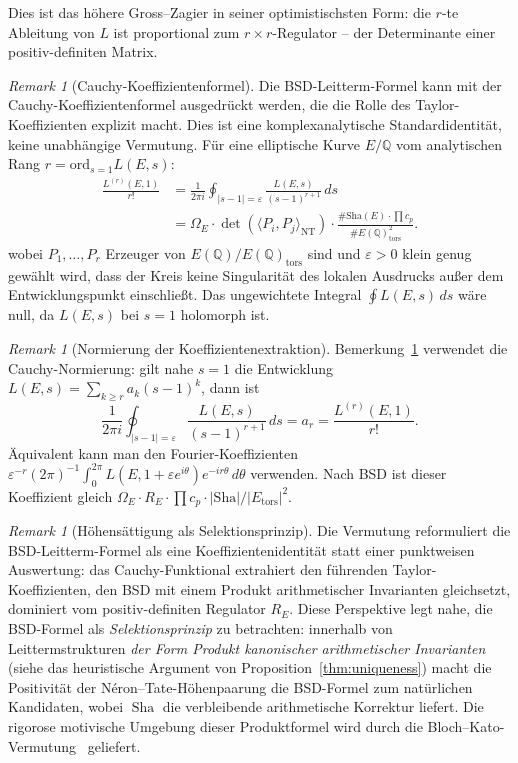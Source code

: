 \documentclass[aps,prd,twocolumn,superscriptaddress,nofootinbib,floatfix]{revtex4-2}
\theoremstyle{definition}
\theoremstyle{remark}
\newtheorem{remark}[theorem]{Remark}
\DeclareMathOperator{\Sha}{Sha}
\begin{document}
Dies ist das \glqq höhere Gross--Zagier\grqq{} in seiner optimistischsten Form: die $r$-te Ableitung von $L$ ist proportional zum $r \times r$-Regulator -- der Determinante einer positiv-definiten Matrix.

\begin{remark}[Cauchy-Koeffizientenformel]
\label{conj:height-saturation-identity}
Die BSD-Leitterm-Formel kann mit der Cauchy-Koeffizientenformel ausgedrückt werden, die die Rolle des Taylor-Koeffizienten explizit macht. Dies ist eine komplexanalytische Standardidentität, keine unabhängige Vermutung. Für eine elliptische Kurve $E/\mathbb{Q}$ vom analytischen Rang $r = \mathrm{ord}_{s=1} L(E,s)$:
\[
\begin{aligned}
\frac{L^{(r)}(E, 1)}{r!}
&= \frac{1}{2\pi i}
   \oint_{|s-1|=\varepsilon}
   \frac{L(E, s)}{(s-1)^{r+1}} \, ds \\
&= \Omega_E \cdot \det(\langle P_i, P_j \rangle_{\mathrm{NT}})
   \cdot \frac{\#\mathrm{Sha}(E) \cdot \prod c_p}
   {\#E(\mathbb{Q})_{\mathrm{tors}}^2}.
\end{aligned}
\]
wobei $P_1, \ldots, P_r$ Erzeuger von $E(\mathbb{Q}) / E(\mathbb{Q})_{\mathrm{tors}}$ sind und $\varepsilon>0$ klein genug gewählt wird, dass der Kreis keine Singularität des lokalen Ausdrucks außer dem Entwicklungspunkt einschließt. Das ungewichtete Integral $\oint L(E,s)\,ds$ wäre null, da $L(E,s)$ bei $s=1$ holomorph ist.
\end{remark}

\begin{remark}[Normierung der Koeffizientenextraktion]\label{rem:disc-normalization}
Bemerkung~\ref{conj:height-saturation-identity} verwendet die Cauchy-Normierung: gilt nahe $s=1$ die Entwicklung $L(E,s)=\sum_{k\geq r} a_k(s-1)^k$, dann ist
\[
\frac{1}{2\pi i}\oint_{|s-1|=\varepsilon}
  \frac{L(E,s)}{(s-1)^{r+1}}\,ds
 = a_r = \frac{L^{(r)}(E,1)}{r!}.
\]
Äquivalent kann man den Fourier-Koeffizienten
$\varepsilon^{-r}(2\pi)^{-1}\int_0^{2\pi} L(E,1+\varepsilon e^{i\theta})e^{-ir\theta}\,d\theta$ verwenden.
Nach BSD ist dieser Koeffizient gleich $\Omega_E \cdot R_E \cdot \prod c_p \cdot |\mathrm{Sha}| / |E_{\mathrm{tors}}|^2$.
\end{remark}

\begin{remark}[Höhensättigung als Selektionsprinzip]
\label{rem:height-saturation}
Die Vermutung reformuliert die BSD-Leitterm-Formel als eine Koeffizientenidentität statt einer punktweisen Auswertung: das Cauchy-Funktional extrahiert den führenden Taylor-Koeffizienten, den BSD mit einem Produkt arithmetischer Invarianten gleichsetzt, dominiert vom positiv-definiten Regulator $R_E$. Diese Perspektive legt nahe, die BSD-Formel als \emph{Selektionsprinzip} zu betrachten: innerhalb von Leittermstrukturen \textit{der Form \glqq Produkt kanonischer arithmetischer Invarianten\grqq{}} (siehe das heuristische Argument von Proposition~\ref{thm:uniqueness}) macht die Positivität der Néron--Tate-Höhenpaarung die BSD-Formel zum natürlichen Kandidaten, wobei $\Sha$ die verbleibende arithmetische Korrektur liefert. Die rigorose motivische Umgebung dieser Produktformel wird durch die Bloch--Kato-Vermutung~\cite{BlochKato1990} geliefert.
\end{remark}
\end{document}
